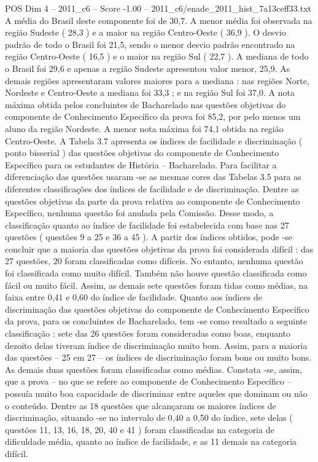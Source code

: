 \begin{textsample}{POS Dim 4 – 2011\_c6 – Score -1.00 – 2011\_c6/enade\_2011\_hist\_7a13ceff33.txt}
A média do Brasil deste componente foi de 30,7.
A menor média foi observada na região Sudeste ( 28,3 ) e a maior na região Centro-Oeste ( 36,9 ).
O desvio padrão de todo o Brasil foi 21,5, sendo o menor desvio padrão encontrado na região Centro-Oeste ( 16,5 ) e o maior na região Sul ( 22,7 ).
A mediana de todo o Brasil foi 29,6 e apenas a região Sudeste apresentou valor menor, 25,9.
As demais regiões apresentaram valores maiores para a mediana : nas regiões Norte, Nordeste e Centro-Oeste a mediana foi 33,3 ; e na região Sul foi 37,0.
A nota máxima obtida pelos concluintes de Bacharelado nas questões objetivas do componente de Conhecimento Específico da prova foi 85,2, por pelo menos um aluno da região Nordeste.
A menor nota máxima foi 74,1 obtida na região Centro-Oeste.
A Tabela 3.7 apresenta os índices de facilidade e discriminação ( ponto bisserial ) das questões objetivas do componente de Conhecimento Específico para os estudantes de História – Bacharelado.
Para facilitar a diferenciação das questões usaram -se as mesmas cores das Tabelas 3.5 para as diferentes classificações dos índices de facilidade e de discriminação.
Dentre as questões objetivas da parte da prova relativa ao componente de Conhecimento Específico, nenhuma questão foi anulada pela Comissão.
Desse modo, a classificação quanto ao índice de facilidade foi estabelecida com base nas 27 questões ( questões 9 a 25 e 36 a 45 ).
A partir dos índices obtidos, pode -se concluir que a maioria das questões objetivas da prova foi considerada difícil : das 27 questões, 20 foram classificadas como difíceis.
No entanto, nenhuma questão foi classificada como muito difícil.
Também não houve questão classificada como fácil ou muito fácil.
Assim, as demais sete questões foram tidas como médias, na faixa entre 0,41 e 0,60 do índice de facilidade.
Quanto aos índices de discriminação das questões objetivas do componente de Conhecimento Específico da prova, para os concluintes de Bacharelado, tem -se como resultado a seguinte classificação : sete das 26 questões foram consideradas como boas, enquanto dezoito delas tiveram índice de discriminação muito bom.
Assim, para a maioria das questões – 25 em 27 – os índices de discriminação foram bons ou muito bons.
As demais duas questões foram classificadas como médias.
Constata -se, assim, que a prova – no que se refere ao componente de Conhecimento Específico – possuía muito boa capacidade de discriminar entre aqueles que dominam ou não o conteúdo.
Dentre as 18 questões que alcançaram os maiores índices de discriminação, situando -se no intervalo de 0,40 a 0,50 do índice, sete delas ( questões 11, 13, 16, 18, 20, 40 e 41 ) foram classificadas na categoria de dificuldade média, quanto ao índice de facilidade, e as 11 demais na categoria difícil.

\end{textsample}
